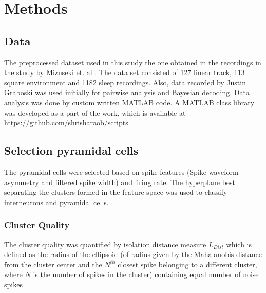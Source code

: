 \chapter{Methods}
\label{analysis}

\section{Data}
The preprocessed dataset used in this study the one obtained in the recordings in the study by Mizuseki et. al \cite{Mizuseki2012}. The data set consisted of 127 linear track, 113 square environment and 1182 sleep recordings. Also, data recorded by Justin Graboski was used initially for pairwise analysis and Bayesian decoding. Data analysis was done by custom written MATLAB code. A MATLAB class library was developed as a part of the work, which is available at \url{https://github.com/shrisharaob/scripts}

\section{Selection pyramidal cells}
The pyramidal cells were selected based on spike features (Spike waveform asymmetry and filtered spike width) \cite{Sirota2008} and firing rate. The hyperplane best separating the clusters formed in the feature space was used to classify interneurons and pyramidal cells.

\subsection{Cluster Quality}
The cluster quality was quantified by isolation distance measure $ L_{Dist} $ which is defined as the radius of the ellipsoid (of radius given by the Mahalanobis distance from the cluster center and the $N^{th}$ closest spike belonging to a different cluster, where $N$ is the number of spikes in the cluster) containing equal number of noise spikes \cite{Harris2001, Schmitzer-Torbert2005}.

